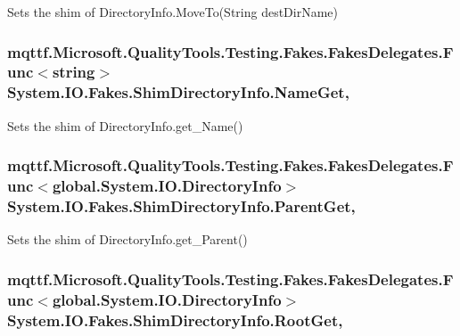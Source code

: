 Sets the shim of Directory\-Info.\-Move\-To(\-String dest\-Dir\-Name)

\hypertarget{class_system_1_1_i_o_1_1_fakes_1_1_shim_directory_info_acd9a2f32100e70544b2795d931200a56}{
\subsubsection[{Name\-Get}]{\setlength{\rightskip}{0pt plus 5cm}mqttf.\-Microsoft.\-Quality\-Tools.\-Testing.\-Fakes.\-Fakes\-Delegates.\-Func$<$string$>$ System.\-I\-O.\-Fakes.\-Shim\-Directory\-Info.\-Name\-Get\hspace{0.3cm}{\ttfamily [get]}, {\ttfamily [set]}}}\label{class_system_1_1_i_o_1_1_fakes_1_1_shim_directory_info_acd9a2f32100e70544b2795d931200a56}


Sets the shim of Directory\-Info.\-get\-\_\-\-Name()

\hypertarget{class_system_1_1_i_o_1_1_fakes_1_1_shim_directory_info_a1203aa69d28337ddda9522cad01c3fdf}{
\subsubsection[{Parent\-Get}]{\setlength{\rightskip}{0pt plus 5cm}mqttf.\-Microsoft.\-Quality\-Tools.\-Testing.\-Fakes.\-Fakes\-Delegates.\-Func$<$global.\-System.\-I\-O.\-Directory\-Info$>$ System.\-I\-O.\-Fakes.\-Shim\-Directory\-Info.\-Parent\-Get\hspace{0.3cm}{\ttfamily [get]}, {\ttfamily [set]}}}\label{class_system_1_1_i_o_1_1_fakes_1_1_shim_directory_info_a1203aa69d28337ddda9522cad01c3fdf}


Sets the shim of Directory\-Info.\-get\-\_\-\-Parent()

\hypertarget{class_system_1_1_i_o_1_1_fakes_1_1_shim_directory_info_aff0a736879e4fc33a52f048cee3c178b}{
\subsubsection[{Root\-Get}]{\setlength{\rightskip}{0pt plus 5cm}mqttf.\-Microsoft.\-Quality\-Tools.\-Testing.\-Fakes.\-Fakes\-Delegates.\-Func$<$global.\-System.\-I\-O.\-Directory\-Info$>$ System.\-I\-O.\-Fakes.\-Shim\-Directory\-Info.\-Root\-Get\hspace{0.3cm}{\ttfamily [get]}, {\ttfamily [set]}}}\label{class_system_1_1_i_o_1_1_fakes_1_1_shim_directory_info_aff0a736879e4fc33a52f048cee3c178b}


